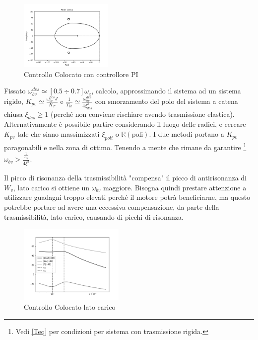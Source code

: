 \begin{figure}[h]
    \centering
    \includegraphics[width=0.4\textwidth]{Immagini/controllo_v_colocato_PI.png}
    \caption{Controllo Colocato con controllore PI}
\end{figure}

Fissato \(\omega_{bv}^{des} \simeq [0.5\div 0.7]\omega_z\), calcolo, approssimando il sistema ad un sistema rigido, \(K_{pv} \simeq \frac{\omega_{bv}^{des} J}{K_T}\) e \(\frac{1}{T_{iv}} \simeq \frac{\omega_{bv}^{des}}{4 \xi_{des}^2}\) con smorzamento del polo del sistema a catena chiusa \(\xi_{des} \geqslant 1\) (perché non conviene rischiare avendo trasmissione elastica).
Alternativamente è possibile partire considerando il luogo delle radici, e cercare \(K_{pv}\) tale che siano massimizzati \(\xi_{poli}\) o \(\mathbb{R}(\text{poli})\).
I due metodi portano a \(K_{pv}\) paragonabili e nella zona di ottimo.
Tenendo a mente che rimane da garantire \footnote{Vedi \ref{Teq} per condizioni per sistema con trasmissione rigida.} \(\omega_{bv} > \frac{\frac{1}{T_{eq}}}{4\xi^2}\).

Il picco di risonanza della trasmissibilità "compensa" il picco di antirisonanza di \(W_v\), lato carico si ottiene un \(\omega_{bv}\) maggiore.
Bisogna quindi prestare attenzione a utilizzare guadagni troppo elevati perché il motore potrà beneficiarne, ma questo potrebbe portare ad avere una eccessiva compensazione, da parte della trasmissibilità, lato carico, causando di picchi di risonanza.

\begin{figure}[h]
    \centering
    \includegraphics[width=0.45\textwidth]{Immagini/colocato_v_lato_carico.png}
    \caption{Controllo Colocato lato carico}
\end{figure}

